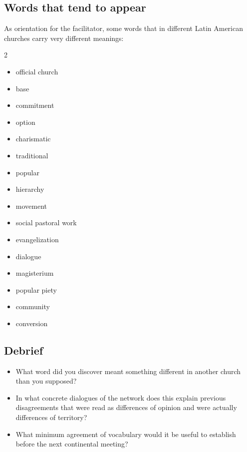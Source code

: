 \documentclass[11pt, a4paper]{article}
\begin{document}
\begin{actividad}
\subsection*{Words that tend to appear}
As orientation for the facilitator, some words that in different Latin American churches carry very different meanings:

\begin{multicols}{2}
\begin{itemize}[leftmargin=1.2em]
  \item official church
  \item base
  \item commitment
  \item option
  \item charismatic
  \item traditional
  \item popular
  \item hierarchy
  \item movement
  \item social pastoral work
  \item evangelization
  \item dialogue
  \item magisterium
  \item popular piety
  \item community
  \item conversion
\end{itemize}
\end{multicols}

\subsection*{Debrief}
\begin{itemize}
  \item What word did you discover meant something different in another church than you supposed?
  \item In what concrete dialogues of the network does this explain previous disagreements that were read as differences of opinion and were actually differences of territory?
  \item What minimum agreement of vocabulary would it be useful to establish before the next continental meeting?
\end{itemize}


\end{actividad}
\end{document}
